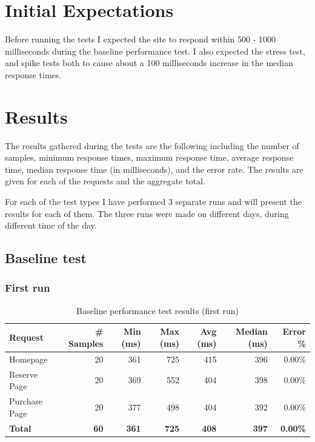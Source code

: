 \documentclass[11pt, leqno, oneside]{article}
\begin{document}
\section{Initial Expectations}

Before running the tests I expected the site to respond within 500 - 1000 milliseconds during the baseline performance test. I also expected the stress test, and spike tests both to cause about a 100 milliseconds increase in the median response times.

\section{Results}

The results gathered during the tests are the following including the number of samples, minimum response times, maximum response time, average response time, median response time (in milliseconds), and the error rate.
The results are given for each of the requests and the aggregate total.

For each of the test types I have performed 3 separate runs and will present the results for each of them.
The three runs were made on different days, during different time of the day.

\subsection{Baseline test}

\subsubsection{First run}

\begin{table}[H]
\centering
\small
\begin{tabularx}{\textwidth}{X r r r r r r}
  \hline
  \textbf{Request} & \textbf{\# Samples} & \textbf{Min (ms)} & \textbf{Max (ms)} & \textbf{Avg (ms)} & \textbf{Median (ms)} & \textbf{Error \%} \\
  \hline
  Homepage      & 20 & 361 & 725 & 415 & 396 & 0.00\% \\
  Reserve Page  & 20 & 369 & 552 & 404 & 398 & 0.00\% \\
  Purchase Page & 20 & 377 & 498 & 404 & 392 & 0.00\% \\
  \hline
  \textbf{Total} & \textbf{60} & \textbf{361} & \textbf{725} & \textbf{408} & \textbf{397} & \textbf{0.00\%} \\
  \hline
\end{tabularx}
\caption{Baseline performance test results (first run)}
\label{tab:performance}
\end{table}
\end{document}
